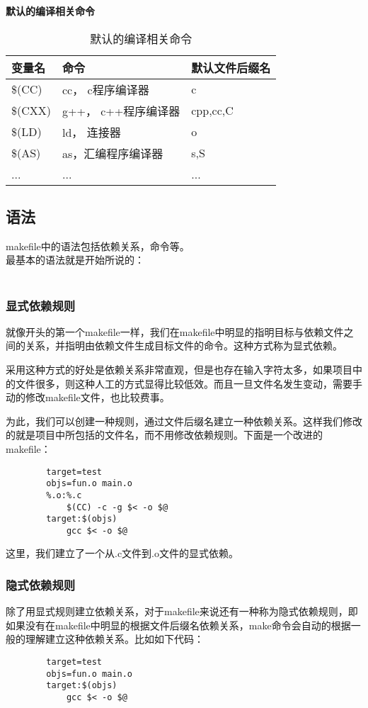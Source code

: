\documentclass{article}
\begin{document}
\begin{CJK}{UTF8}{gbsn}
	\textbf{默认的编译相关命令}\\
	\begin{table}[!htp]
	\begin{tabular}{l|l|l}
		\hline
		变量名 & 命令 & 默认文件后缀名\\
		\hline
		\$(CC) & cc， c程序编译器 & c\\
		\hline
		\$(CXX) & g++， c++程序编译器 & cpp,cc,C\\
		\hline
		\$(LD) & ld， 连接器 & o\\
		\hline
		\$(AS) & as，汇编程序编译器 & s,S\\
		\hline
		... & ... & ...\\
		\hline
	\end{tabular}
		\caption{默认的编译相关命令}
	\end{table}
	\subsection{语法}
	makefile中的语法包括依赖关系，命令等。\\
	最基本的语法就是开始所说的：\\
	\\
	\subsubsection{显式依赖规则}
	就像开头的第一个makefile一样，我们在makefile中明显的指明目标与依赖文件之间的关系，并指明由依赖文件生成目标文件的命令。这种方式称为显式依赖。\par
	采用这种方式的好处是依赖关系非常直观，但是也存在输入字符太多，如果项目中的文件很多，则这种人工的方式显得比较低效。而且一旦文件名发生变动，需要手动的修改makefile文件，也比较费事。\par
	为此，我们可以创建一种规则，通过文件后缀名建立一种依赖关系。这样我们修改的就是项目中所包括的文件名，而不用修改依赖规则。下面是一个改进的makefile：\par
	\begin{verbatim}
		target=test
		objs=fun.o main.o
		%.o:%.c
		    $(CC) -c -g $< -o $@
		target:$(objs)
		    gcc $< -o $@ 
	\end{verbatim}
		这里，我们建立了一个从.c文件到.o文件的显式依赖。
	\subsubsection{隐式依赖规则}
	除了用显式规则建立依赖关系，对于makefile来说还有一种称为隐式依赖规则，即如果没有在makefile中明显的根据文件后缀名依赖关系，make命令会自动的根据一般的理解建立这种依赖关系。比如如下代码：\par
	\begin{verbatim}
		target=test
		objs=fun.o main.o
		target:$(objs)
		    gcc $< -o $@
	\end{verbatim}



\end{CJK}
\end{document}
